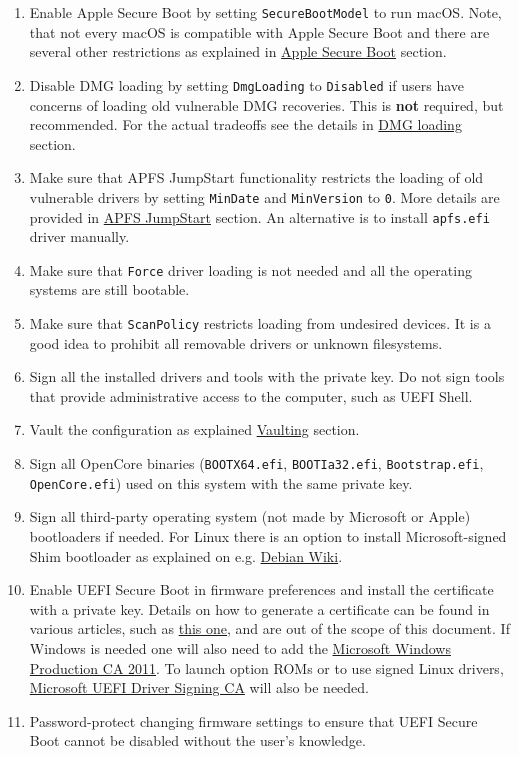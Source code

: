 \documentclass[]{article}
\begin{document}
\begin{enumerate}
\item Enable Apple Secure Boot by setting \texttt{SecureBootModel} to
  run macOS. Note, that not every macOS is compatible with Apple Secure Boot and
  there are several other restrictions as explained in
  \hyperref[secureapplesb]{Apple Secure Boot} section.
\item Disable DMG loading by setting \texttt{DmgLoading} to \texttt{Disabled}
  if users have concerns of loading old vulnerable DMG recoveries. This is
  \textbf{not} required, but recommended. For the actual tradeoffs
  see the details in \hyperref[securedmgloading]{DMG loading} section.
\item Make sure that APFS JumpStart functionality restricts the loading
  of old vulnerable drivers by setting \texttt{MinDate} and \texttt{MinVersion}
  to \texttt{0}. More details are provided in \hyperref[uefiapfsprops]{APFS JumpStart}
  section. An alternative is to install \texttt{apfs.efi} driver manually.
\item Make sure that \texttt{Force} driver loading is not needed and
  all the operating systems are still bootable.
\item Make sure that \texttt{ScanPolicy} restricts loading from undesired
  devices. It is a good idea to prohibit all removable drivers or unknown
  filesystems.
\item Sign all the installed drivers and tools with the private key. Do not sign
  tools that provide administrative access to the computer, such as UEFI Shell.
\item Vault the configuration as explained \hyperref[securevaulting]{Vaulting}
  section.
\item Sign all OpenCore binaries (\texttt{BOOTX64.efi}, \texttt{BOOTIa32.efi},
  \texttt{Bootstrap.efi}, \texttt{OpenCore.efi}) used on this system with
  the same private key.
\item Sign all third-party operating system (not made by Microsoft or Apple)
  bootloaders if needed. For Linux there is an option to install
  Microsoft-signed Shim bootloader as explained on e.g.
  \href{https://wiki.debian.org/SecureBoot}{Debian Wiki}.
\item Enable UEFI Secure Boot in firmware preferences and install the
  certificate with a private key. Details on how to generate a certificate
  can be found in various articles, such as \href{https://habr.com/en/post/273497}{this one},
  and are out of the scope of this document. If Windows is needed one
  will also need to add the
  \href{http://go.microsoft.com/fwlink/?LinkID=321192}{Microsoft Windows Production CA 2011}.
  To launch option ROMs or to use signed Linux drivers,
  \href{http://go.microsoft.com/fwlink/?LinkId=321194}{Microsoft UEFI Driver Signing CA} will also be needed.
\item Password-protect changing firmware settings to ensure that UEFI Secure Boot
  cannot be disabled without the user's knowledge.
\end{enumerate}
\end{document}
